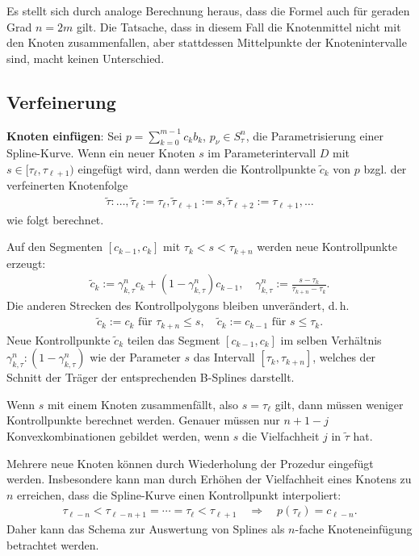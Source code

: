Es stellt sich durch analoge Berechnung heraus, dass die Formel auch für geraden Grad $n = 2m$
gilt.
Die Tatsache, dass in diesem Fall die Knotenmittel nicht mit den Knoten zusammenfallen, aber
stattdessen Mittelpunkte der Knotenintervalle sind, macht keinen Unterschied.

\pagebreak

\subsection{%
    Verfeinerung%
}

\textbf{Knoten einfügen}:
Sei $p = \sum_{k=0}^{m-1} c_k b_k$, $p_\nu \in S_\tau^n$, die Parametrisierung einer Spline-Kurve.
Wenn ein neuer Knoten $s$ im Parameterintervall $D$ mit $s \in [\tau_\ell, \tau_{\ell+1})$
eingefügt wird, dann werden die Kontrollpunkte $\widetilde{c}_k$ von $p$ bzgl. der
verfeinerten Knotenfolge
\begin{align*}
    \widetilde{\tau}\colon \dotsc, \widetilde{\tau}_\ell := \tau_\ell,
    \widetilde{\tau}_{\ell+1} := s, \widetilde{\tau}_{\ell+2} := \tau_{\ell+1}, \dotsc
\end{align*}
wie folgt berechnet.

Auf den Segmenten $[c_{k-1}, c_k]$ mit $\tau_k < s < \tau_{k+n}$ werden neue Kontrollpunkte
erzeugt:
\begin{align*}
    \widetilde{c}_k := \gamma_{k,\tau}^n c_k + (1 - \gamma_{k,\tau}^n) c_{k-1},\quad
    \gamma_{k,\tau}^n := \frac{s - \tau_k}{\tau_{k+n} - \tau_k}.
\end{align*}
Die anderen Strecken des Kontrollpolygons bleiben unverändert, d.\,h.
\begin{align*}
    \widetilde{c}_k := c_k \text{ für } \tau_{k+n} \le s,\quad
    \widetilde{c}_k := c_{k-1} \text{ für } s \le \tau_k.
\end{align*}
Neue Kontrollpunkte $\widetilde{c}_k$ teilen das Segment $[c_{k-1}, c_k]$ im selben Verhältnis
$\gamma_{k,\tau}^n : (1 - \gamma_{k,\tau}^n)$
wie der Parameter $s$ das Intervall $[\tau_k, \tau_{k+n}]$,
welches der Schnitt der Träger der entsprechenden B-Splines darstellt.

Wenn $s$ mit einem Knoten zusammenfällt, also $s = \tau_\ell$ gilt,
dann müssen weniger Kontrollpunkte berechnet werden.
Genauer müssen nur $n + 1 - j$ Konvexkombinationen gebildet werden,
wenn $s$ die Vielfachheit $j$ in $\widetilde{\tau}$ hat.

Mehrere neue Knoten können durch Wiederholung der Prozedur eingefügt werden.
Insbesondere kann man durch Erhöhen der Vielfachheit eines Knotens zu $n$ erreichen,
dass die Spline-Kurve einen Kontrollpunkt interpoliert:
\begin{align*}
    \tau_{\ell-n} < \tau_{\ell-n+1} = \dotsb = \tau_\ell < \tau_{\ell+1}
    \quad\Rightarrow\quad p(\tau_\ell) = c_{\ell-n}.
\end{align*}
Daher kann das Schema zur Auswertung von Splines als $n$-fache Knoteneinfügung betrachtet werden.

